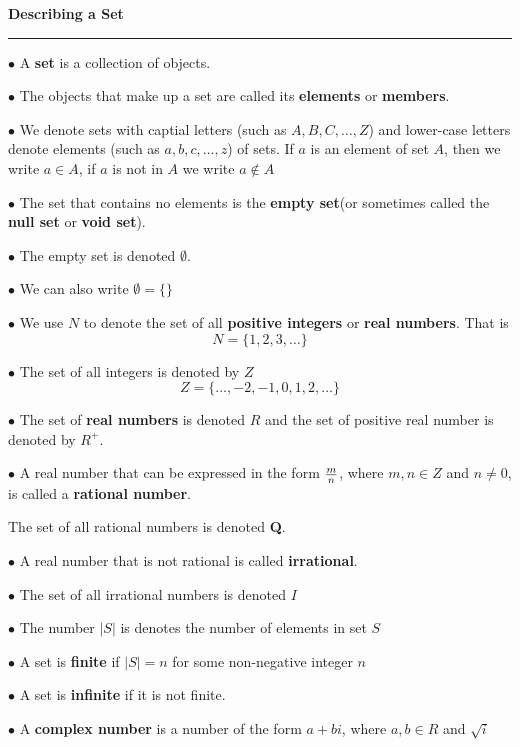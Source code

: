 {\bf Describing a Set}
\hrule
\vskip 6pt

$\bullet$ A {\bf set} is a collection of objects.
\vskip 1pc

$\bullet$ The objects that make up a set are called its {\bf elements} or {\bf members}.
\vskip 1pc

$\bullet$ We denote sets with captial letters (such as $A,B,C,\ldots,Z$) and lower-case letters denote elements (such as $a,b,c,\ldots,z$) of sets. If $a$ is an element of set $A$, then we write $a\in A$, if $a$ is not in $A$ we write $a\not\in A$
\vskip 1pc

$\bullet$ The set that contains no elements is the {\bf empty set}(or sometimes called the {\bf null set} or {\bf void set}).
\vskip 1pc

$\bullet$ The empty set is denoted $\emptyset$.
\vskip 1pc

$\bullet$ We can also write $\emptyset=\lbrace \rbrace$
\vskip 1pc

$\bullet$ We use {\bf $N$} to denote the set of all {\bf positive integers} or {\bf real numbers}. That is $$N=\lbrace 1, 2, 3,\ldots\rbrace$$

$\bullet$ The set of all integers is denoted by $Z$ $$Z=\lbrace\ldots , -2, -1, 0, 1, 2, \ldots\rbrace$$

$\bullet$ The set of {\bf real numbers} is denoted $R$ and the set of positive real number is denoted by $R^+$.
\vskip 1pc

$\bullet$ A real number that can be expressed in the form ${m\over n}$, where $m,n\in Z$ and $n\neq 0$, is called a {\bf rational number}.
\vskip 1mm

The set of all rational numbers is denoted {\bf Q}.
\vskip 1pc

$\bullet$ A real number that is not rational is called {\bf irrational}.
\vskip 1mm

$\bullet$ The set of all irrational numbers is denoted $I$
\vskip 1pc

$\bullet$ The number $|S|$ is denotes the number of elements in set $S$
\vskip 1pc

$\bullet$ A set is {\bf finite} if $|S|=n$ for some non-negative integer $n$
\vskip 1pc

$\bullet$ A set is {\bf infinite} if it is not finite.
\vskip 1pc

$\bullet$ A {\bf complex number} is a number of the form $a+bi$, where $a,b\in R$ and $\sqrt{i}$
\vskip 1pc


\vfill\eject
